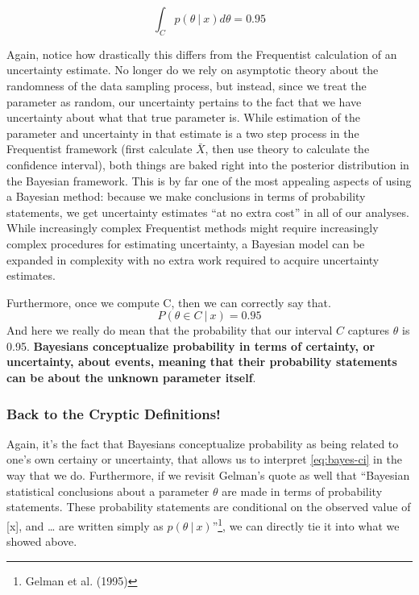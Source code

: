 \documentclass[12pt,twoside]{reedthesis}
\begin{document}
\[
\int_C p(\theta \ | \ x)d\theta = 0.95
\]

Again, notice how drastically this differs from the Frequentist calculation of an uncertainty estimate. No longer do we rely on asymptotic theory about the randomness of the data sampling process, but instead, since we treat the parameter as random, our uncertainty pertains to the fact that we have uncertainty about what that true parameter is. While estimation of the parameter and uncertainty in that estimate is a two step process in the Frequentist framework (first calculate \(\bar{X}\), then use theory to calculate the confidence interval), both things are baked right into the posterior distribution in the Bayesian framework. This is by far one of the most appealing aspects of using a Bayesian method: because we make conclusions in terms of probability statements, we get uncertainty estimates ``at no extra cost'' in all of our analyses. While increasingly complex Frequentist methods might require increasingly complex procedures for estimating uncertainty, a Bayesian model can be expanded in complexity with no extra work required to acquire uncertainty estimates.

Furthermore, once we compute C, then we can correctly say that.
\begin{equation}
  P(\theta \in C \ | \ x) = 0.95
  \label{eq:bayes-ci}
\end{equation}
And here we really do mean that the probability that our interval \(C\) captures \(\theta\) is 0.95. \textbf{Bayesians conceptualize probability in terms of certainty, or uncertainty, about events, meaning that their probability statements can be about the unknown parameter itself}.

\hypertarget{back-to-the-cryptic-definitions}{%
\subsubsection{Back to the Cryptic Definitions!}\label{back-to-the-cryptic-definitions}}

Again, it's the fact that Bayesians conceptualize probability as being related to one's own certainy or uncertainty, that allows us to interpret \eqref{eq:bayes-ci} in the way that we do. Furthermore, if we revisit Gelman's quote as well that ``Bayesian statistical conclusions about a parameter \(\theta\) are made in terms of probability statements. These probability statements are conditional on the observed value of {[}x{]}, and \ldots{} are written simply as \(p(\theta \ | \ x)\)''\footnote{Gelman et al. (1995)}, we can directly tie it into what we showed above.
\end{document}

